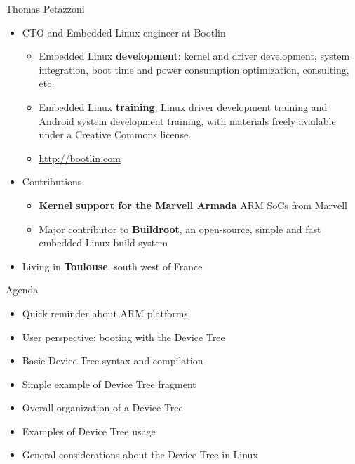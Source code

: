 \documentclass[obeyspaces,spaces,hyphens]{beamer}
\begin{document}
\begin{frame}{Thomas Petazzoni}
  \begin{itemize}
  \item CTO and Embedded Linux engineer at Bootlin
    \begin{itemize}
    \item Embedded Linux {\bf development}: kernel and driver
      development, system integration, boot time and power
      consumption optimization, consulting, etc.
    \item Embedded Linux {\bf training}, Linux driver development training
      and Android system development training, with materials freely
      available under a Creative Commons license.
    \item \url{http://bootlin.com}
    \end{itemize}
  \item Contributions
    \begin{itemize}
    \item {\bf Kernel support for the Marvell Armada} ARM SoCs from
      Marvell
    \item Major contributor to {\bf Buildroot}, an open-source, simple and
      fast embedded Linux build system
    \end{itemize}
  \item Living in {\bf Toulouse}, south west of France
  \end{itemize}
\end{frame}

\begin{frame}{Agenda}
  \begin{itemize}
  \item Quick reminder about ARM platforms
  \item User perspective: booting with the Device Tree
  \item Basic Device Tree syntax and compilation
  \item Simple example of Device Tree fragment
  \item Overall organization of a Device Tree
  \item Examples of Device Tree usage
  \item General considerations about the Device Tree in Linux
  \end{itemize}
\end{frame}
\end{document}
